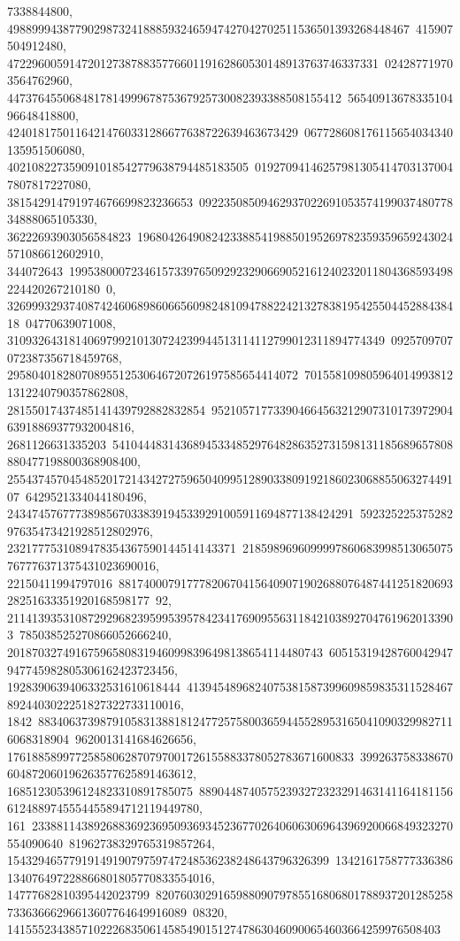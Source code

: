 {{{7338844800, 49889994387790298732418885932465947427042702511536501393268448467\
415907504912480, 472296005914720127387883577660119162860530148913763746337331\
024287719703564762960, 447376455068481781499967875367925730082393388508155412\
5654091367833510496648418800, 42401817501164214760331286677638722639463673429\
067728608176115654034340135951506080, 402108227359091018542779638794485183505\
019270941462579813054147031370047807817227080, 381542914791974676699823236653\
0922350850946293702269105357419903748077834888065105330, 36222693903056584823\
196804264908242338854198850195269782359359659243024571086612602910, 344072643\
19953800072346157339765092923290669052161240232011804368593498224420267210180\
0, 32699932937408742460689860665609824810947882242132783819542550445288438418\
04770639071008, 3109326431814069799210130724239944513114112799012311894774349\
0925709707072387356718459768, 29580401828070895512530646720726197585654414072\
7015581098059640149938121312240790357862808, 28155017437485141439792882832854\
95210571773390466456321290731017397290463918869377932004816, 2681126631335203\
5410444831436894533485297648286352731598131185689657808880477198800368908400, 
   25543745704548520172143427275965040995128903380919218602306885506327449107\
6429521334044180496, 24347457677738985670338391945339291005911694877138424291\
59232522537528297635473421928512802976, 2321777531089478354367590144514143371\
2185989696099997860683998513065075767776371375431023690016, 22150411994797016\
88174000791777820670415640907190268807648744125182069328251633351920168598177\
92, 2114139353108729296823959953957842341769095563118421038927047619620133903\
785038525270866052666240, 201870327491675965808319460998396498138654114480743\
60515319428760042947947745982805306162423723456, 1928390639406332531610618444\
41394548968240753815873996098598353115284678924403022251827322733110016, 1842\
88340637398791058313881812477257580036594455289531650410903299827116068318904\
9620013141684626656, 17618858997725858062870797001726155883378052783671600833\
399263758338670604872060196263577625891463612, 168512305396124823310891785075\
889044874057523932723232914631411641811566124889745554455894712119449780, 161\
23388114389268836923695093693452367702640606306964396920066849323270554090640\
81962738329765319857264, 1543294657791914919079759747248536238248643796326399\
1342161758777336386134076497228866801805770833554016, 14777682810395442023799\
82076030291659880907978551680680178893720128525873363666296613607764649916089\
08320, 1415552343857102226835061458549015127478630460900654603664259976508403\
}}}
